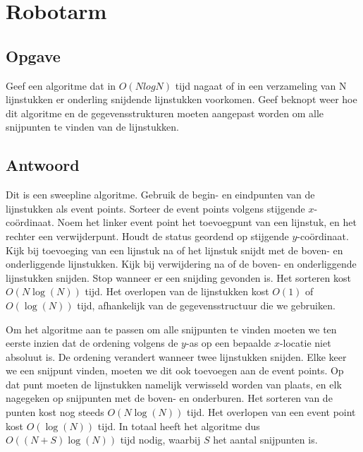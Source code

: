 \documentclass[examenvragen.tex]{subfiles}
\begin{document}
\section{Robotarm}
\subsection{Opgave}
Geef een algoritme dat in $O(N log N)$ tijd nagaat of in een verzameling van N lijnstukken er onderling snijdende lijnstukken voorkomen.
Geef beknopt weer hoe dit algoritme en de gegevensstrukturen moeten aangepast worden om alle snijpunten te vinden van de lijnstukken.

\subsection{Antwoord}
Dit is een sweepline algoritme.
Gebruik de begin- en eindpunten van de lijnstukken als event points.
Sorteer de event points volgens stijgende $x$-co\"ordinaat.
Noem het linker event point het toevoegpunt van een lijnstuk, en het rechter een verwijderpunt.
Houdt de status geordend op stijgende $y$-co\"ordinaat.
Kijk bij toevoeging van een lijnstuk na of het lijnstuk snijdt met de boven- en onderliggende lijnstukken. Kijk bij verwijdering na of de boven- en onderliggende lijnstukken snijden. Stop wanneer er een snijding gevonden is. Het sorteren kost $O(N\log(N))$ tijd. Het overlopen van de lijnstukken kost $O(1)$ of $O(\log (N))$ tijd, afhankelijk van de gegevensstructuur die we gebruiken.

Om het algoritme aan te passen om alle snijpunten te vinden moeten we ten eerste inzien dat de ordening volgens de $y$-as op een bepaalde $x$-locatie niet absoluut is. De ordening verandert wanneer twee lijnstukken snijden. Elke keer we een snijpunt vinden, moeten we dit ook toevoegen aan de event points. Op dat punt moeten de lijnstukken namelijk verwisseld worden van plaats, en elk nagegeken op snijpunten met de boven- en onderburen.
Het sorteren van de punten kost nog steeds $O(N\log(N))$ tijd. Het overlopen van een event point kost $O(\log(N))$ tijd. In totaal heeft het algoritme dus $O((N+S)\log(N))$ tijd nodig, waarbij $S$ het aantal snijpunten is.
\end{document}
